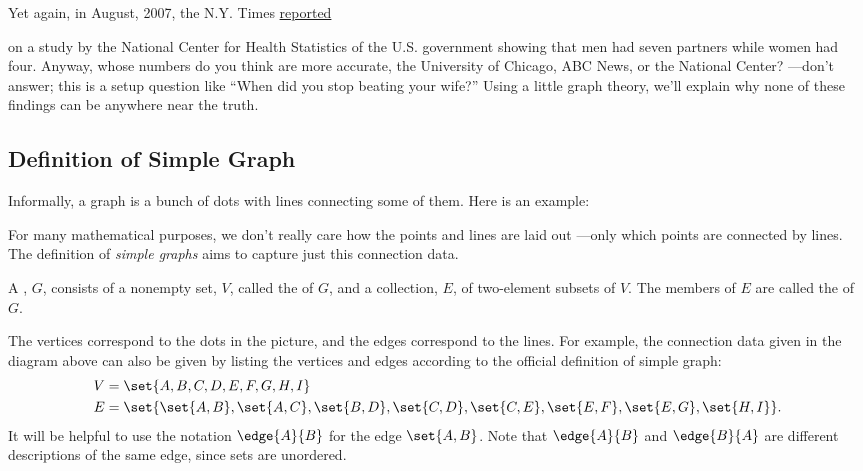 Yet again, in August, 2007, the N.Y. Times
\href{The-Myth-the-Math-the-Sex.pdf}{reported}
\iffalse
\href{http://www.nytimes.com/2007/08/12/weekinreview/12kolata.html?_r=1&n=Top/Reference/Times%20Topics/People/K/Kolata,%20Gina&oref=slogin}{reported}
\fi
on a study by the National Center for Health Statistics of the U.S. government
showing that men had seven partners while women had four.  Anyway, whose numbers do
you think are more accurate, the University of Chicago, ABC News, or the National
Center? ---don't answer; this is a setup question like ``When did you stop beating
your wife?''  Using a little graph theory, we'll explain why none of these findings
can be anywhere near the truth.

\label{degreessec}

\subsection{Definition of Simple Graph}
Informally, a graph is a bunch of dots with lines connecting some of
them.  Here is an example:


For many mathematical purposes, we don't really care how the points and
lines are laid out ---only which points are connected by lines.  The
definition of \emph{simple graphs} aims to capture just this connection
data.

\begin{definition}\label{graphdef} 
A , $G$, consists of a nonempty set, $V$, called the
 of $G$, and a collection, $E$, of two-element subsets of
$V$.  The members of $E$ are called the  of $G$.
\end{definition}
The vertices correspond to the dots in the picture, and the edges
correspond to the lines.  For example, the connection data given in the
diagram above can also be given by listing the vertices and edges according
to the official definition of simple graph:
\begin{align*}
V & =  \set{A, B, C, D, E, F, G, H, I} \\
E & =  \set{ \set{A, B}, \set{A, C}, \set{B, D}, \set{C, D},
              \set{C, E}, \set{E, F}, \set{E, G}, \set{H, I} }.
\end{align*}          
It will be helpful to use the notation $\edge{A}{B}$ for the edge
$\set{A,B}$.  Note that $\edge{A}{B}$ and $\edge{B}{A}$ are different
descriptions of the same edge, since sets are unordered.


